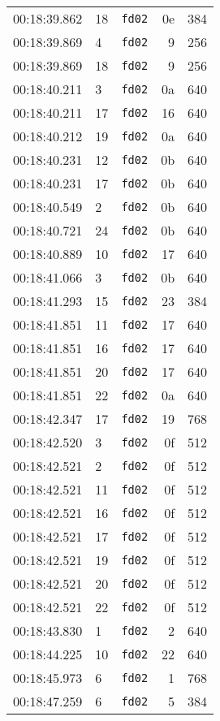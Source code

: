 \documentclass{article}
\begin{document}
\begin{longtable}{lllrr}
00:18:39.862 & 18 & \texttt{fd02} & 0e & 384 \\
00:18:39.869 & 4 & \texttt{fd02} & 9 & 256 \\
00:18:39.869 & 18 & \texttt{fd02} & 9 & 256 \\
00:18:40.211 & 3 & \texttt{fd02} & 0a & 640 \\
00:18:40.211 & 17 & \texttt{fd02} & 16 & 640 \\
00:18:40.212 & 19 & \texttt{fd02} & 0a & 640 \\
00:18:40.231 & 12 & \texttt{fd02} & 0b & 640 \\
00:18:40.231 & 17 & \texttt{fd02} & 0b & 640 \\
00:18:40.549 & 2 & \texttt{fd02} & 0b & 640 \\
00:18:40.721 & 24 & \texttt{fd02} & 0b & 640 \\
00:18:40.889 & 10 & \texttt{fd02} & 17 & 640 \\
00:18:41.066 & 3 & \texttt{fd02} & 0b & 640 \\
00:18:41.293 & 15 & \texttt{fd02} & 23 & 384 \\
00:18:41.851 & 11 & \texttt{fd02} & 17 & 640 \\
00:18:41.851 & 16 & \texttt{fd02} & 17 & 640 \\
00:18:41.851 & 20 & \texttt{fd02} & 17 & 640 \\
00:18:41.851 & 22 & \texttt{fd02} & 0a & 640 \\
00:18:42.347 & 17 & \texttt{fd02} & 19 & 768 \\
00:18:42.520 & 3 & \texttt{fd02} & 0f & 512 \\
00:18:42.521 & 2 & \texttt{fd02} & 0f & 512 \\
00:18:42.521 & 11 & \texttt{fd02} & 0f & 512 \\
00:18:42.521 & 16 & \texttt{fd02} & 0f & 512 \\
00:18:42.521 & 17 & \texttt{fd02} & 0f & 512 \\
00:18:42.521 & 19 & \texttt{fd02} & 0f & 512 \\
00:18:42.521 & 20 & \texttt{fd02} & 0f & 512 \\
00:18:42.521 & 22 & \texttt{fd02} & 0f & 512 \\
00:18:43.830 & 1 & \texttt{fd02} & 2 & 640 \\
00:18:44.225 & 10 & \texttt{fd02} & 22 & 640 \\
00:18:45.973 & 6 & \texttt{fd02} & 1 & 768 \\
00:18:47.259 & 6 & \texttt{fd02} & 5 & 384 \\

\end{longtable}
\end{document}
